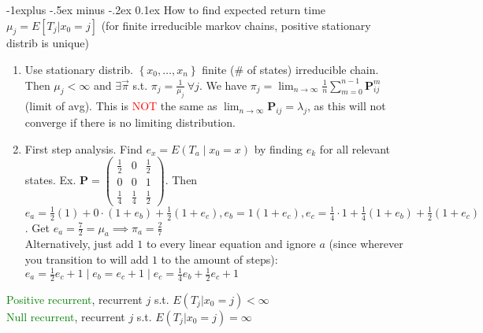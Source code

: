\documentclass[landscape]{article}
\makeatletter
\renewcommand{\subsection}{\@startsection{subsection}{2}{0mm}%
                                {-1explus -.5ex minus -.2ex}%
                                {0.1ex}%
                                {\color{orange}\normalfont\normalsize\bfseries}}
\makeatother
\begin{document}
\begin{multicols*}{3}
\subsection{How to find expected return time}
$\mu_j = E[T_j | x_0 = j]$ (for finite irreducible markov chains,
positive stationary distrib is unique)
\begin{enumerate}
\item Use stationary distrib. $\left\{x_0, \ldots, x_n\right\}$ finite
  (\# of states) irreducible chain. Then $\mu_j < \infty$ and
  $\exists \vec{\pi}$ s.t. $\pi_j = \frac{1}{\mu_j} \ \forall j$. We
  have
  $\pi_j = \lim_{n\to \infty} \frac{1}{n} \sum_{m=0}^{n-1}
  \mathbf{P}_{ij}^m$ (limit of avg). This is \textcolor{red}{NOT} the
  same as $\lim_{n\to \infty}\mathbf{P}_{ij} = \lambda_j$, as this
  will not converge if there is no limiting distribution.
\item First step analysis. Find $e_x = E(T_a \mid x_0 = x)$ by finding
  $e_k$ for all relevant states. Ex. $\mathbf{P} =
  \begin{pmatrix}
    \frac{1}{2} & 0 & \frac{1}{2} \\ 0 & 0 & 1 \\ \frac{1}{4} &
    \frac{1}{4} & \frac{1}{2}
  \end{pmatrix}
  $. Then
  $e_a = \frac{1}{2}(1) + 0 \cdot (1 + e_b) + \frac{1}{2} (1 + e_c),
  e_b = 1 (1 + e_c), e_c = \frac{1}{4}\cdot 1 + \frac{1}{4}(1+ e_b) +
  \frac{1}{2}(1+e_c)$. Get
  $e_a = \frac{7}{2} = \mu_a \implies \pi_a = \frac{2}{7}$
  \\ Alternatively, just add $1$ to every linear equation and ignore $a$ (since
  wherever you transition to will add $1$ to the amount of steps):
  $
    e_a = \frac{1}{2}e_c + 1 \mid
    e_b = e_c + 1 \mid
    e_c = \frac{1}{4}e_b + \frac{1}{2}e_c + 1
    $
\end{enumerate}
\textcolor{green}{Positive recurrent}, recurrent $j$ s.t.
$E(T_j | x_0 = j) < \infty$ \\ \textcolor{green}{Null recurrent},
recurrent $j$ s.t. $E(T_j | x_0 = j) = \infty$ \\

\end{multicols*}
\end{document}

